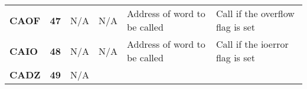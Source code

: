 \documentclass[]{article}
\begin{document}
\begin{longtable}[c]{@{}llllll@{}}
\begin{minipage}[t]{0.14\columnwidth}
\textbf{CAOF}
\strut\end{minipage} &
\begin{minipage}[t]{0.14\columnwidth}\raggedright\strut
\textbf{47}
\strut\end{minipage} &
\begin{minipage}[t]{0.14\columnwidth}\raggedright\strut
N/A
\strut\end{minipage} &
\begin{minipage}[t]{0.14\columnwidth}\raggedright\strut
N/A
\strut\end{minipage} &
\begin{minipage}[t]{0.14\columnwidth}\raggedright\strut
Address of word to be called
\strut\end{minipage} &
\begin{minipage}[t]{0.14\columnwidth}\raggedright\strut
Call if the overflow flag is set
\strut\end{minipage}\tabularnewline
\begin{minipage}[t]{0.14\columnwidth}\raggedright\strut
\textbf{CAIO}
\strut\end{minipage} &
\begin{minipage}[t]{0.14\columnwidth}\raggedright\strut
\textbf{48}
\strut\end{minipage} &
\begin{minipage}[t]{0.14\columnwidth}\raggedright\strut
N/A
\strut\end{minipage} &
\begin{minipage}[t]{0.14\columnwidth}\raggedright\strut
N/A
\strut\end{minipage} &
\begin{minipage}[t]{0.14\columnwidth}\raggedright\strut
Address of word to be called
\strut\end{minipage} &
\begin{minipage}[t]{0.14\columnwidth}\raggedright\strut
Call if the ioerror flag is set
\strut\end{minipage}\tabularnewline
\begin{minipage}[t]{0.14\columnwidth}\raggedright\strut
\textbf{CADZ}
\strut\end{minipage} &
\begin{minipage}[t]{0.14\columnwidth}\raggedright\strut
\textbf{49}
\strut\end{minipage} &
\begin{minipage}[t]{0.14\columnwidth}\raggedright\strut
N/A
\strut\end{minipage} &
\begin{minipage}[t]{0.14\columnwidth}\raggedright\strut

\end{minipage}
\end{longtable}
\end{document}
